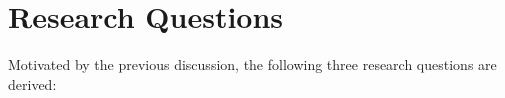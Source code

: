 \section{Research Questions}

Motivated by the previous discussion, the following three research questions are derived:






